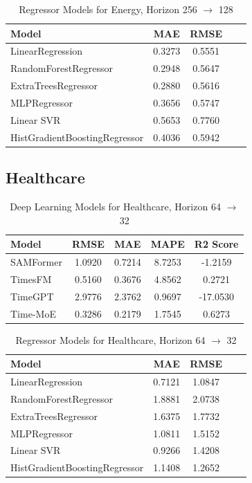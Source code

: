 \begin{table}[h!]
\centering
\begin{tabular}{lcccc}
\hline
Model & MAE & RMSE \\\hline
LinearRegression              & 0.3273 & 0.5551 \\
RandomForestRegressor         & 0.2948 & 0.5647 \\
ExtraTreesRegressor           & 0.2880 & 0.5616 \\
MLPRegressor                  & 0.3656 & 0.5747 \\
Linear SVR                    & 0.5653 & 0.7760 \\
HistGradientBoostingRegressor & 0.4036 & 0.5942 \\
\hline
\end{tabular}
\caption{Regressor Models for Energy, Horizon 256 \texorpdfstring{$\to$}{->} 128}
\label{tab:energy_256to128_reg}
\end{table}
\newpage
\subsection{Healthcare}

\begin{table}[h!]
\centering
\begin{tabular}{lcccc}
\hline
Model & RMSE & MAE & MAPE & R2 Score \\
\hline
SAMFormer & 1.0920 & 0.7214 & 8.7253 & -1.2159 \\
TimesFM   & 0.5160 & 0.3676 & 4.8562 & 0.2721 \\
TimeGPT   & 2.9776 & 2.3762 & 0.9697 & -17.0530 \\
Time-MoE  & 0.3286 & 0.2179 & 1.7545 & 0.6273 \\
\hline
\end{tabular}
\caption{Deep Learning Models for Healthcare, Horizon 64 \texorpdfstring{$\to$}{->} 32}
\label{tab:healthcare_64to32_dl}
\end{table}

\begin{table}[h!]
\centering
\begin{tabular}{lcccc}
\hline
Model & MAE & RMSE \\\hline
LinearRegression              & 0.7121 & 1.0847 \\
RandomForestRegressor         & 1.8881 & 2.0738 \\
ExtraTreesRegressor           & 1.6375 & 1.7732 \\
MLPRegressor                  & 1.0811 & 1.5152 \\
Linear SVR                    & 0.9266 & 1.4208 \\
HistGradientBoostingRegressor & 1.1408 & 1.2652 \\
\hline
\end{tabular}
\caption{Regressor Models for Healthcare, Horizon 64 \texorpdfstring{$\to$}{->} 32}
\label{tab:healthcare_64to32_reg}
\end{table}


